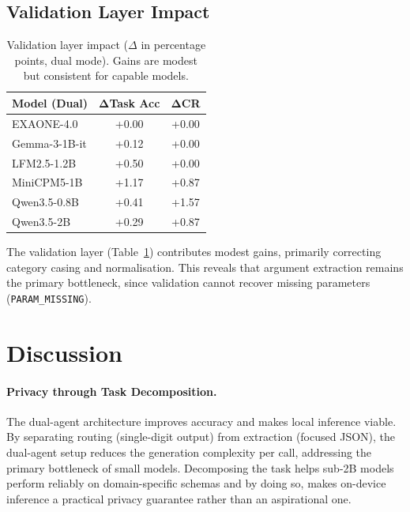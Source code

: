 \documentclass[11pt,twocolumn]{article}
\begin{document}
\subsection{Validation Layer Impact}

\begin{table}[t]
\centering
\small
\begin{tabular}{@{}lcc@{}}
\toprule
\textbf{Model (Dual)} &
$\boldsymbol{\Delta}$\textbf{Task Acc} &
$\boldsymbol{\Delta}$\textbf{CR} \\
\midrule
EXAONE-4.0     & +0.00 & +0.00 \\
Gemma-3-1B-it  & +0.12 & +0.00 \\
LFM2.5-1.2B    & +0.50 & +0.00 \\
MiniCPM5-1B    & +1.17 & +0.87 \\
Qwen3.5-0.8B   & +0.41 & +1.57 \\
Qwen3.5-2B     & +0.29 & +0.87 \\
\bottomrule
\end{tabular}
\caption{Validation layer impact ($\Delta$ in percentage points, dual
mode). Gains are modest but consistent for capable models.}
\label{tab:validation}
\end{table}

The validation layer (Table~\ref{tab:validation}) contributes modest
gains, primarily correcting category casing and normalisation.
This reveals that argument extraction remains the primary bottleneck,
since validation cannot recover missing parameters (\texttt{PARAM\_MISSING}).

\vspace{-5pt}
\section{Discussion}
\label{sec:discussion}
\vspace{-3pt}

\paragraph{Privacy through Task Decomposition.}
The dual-agent architecture improves accuracy and makes local
inference viable.
By separating routing (single-digit output) from extraction (focused
JSON), the dual-agent setup reduces the generation complexity per
call, addressing the primary bottleneck of small models.
Decomposing the task helps sub-2B models perform reliably on
domain-specific schemas and by doing so, makes on-device inference
a practical privacy guarantee rather than an aspirational one.
\end{document}
